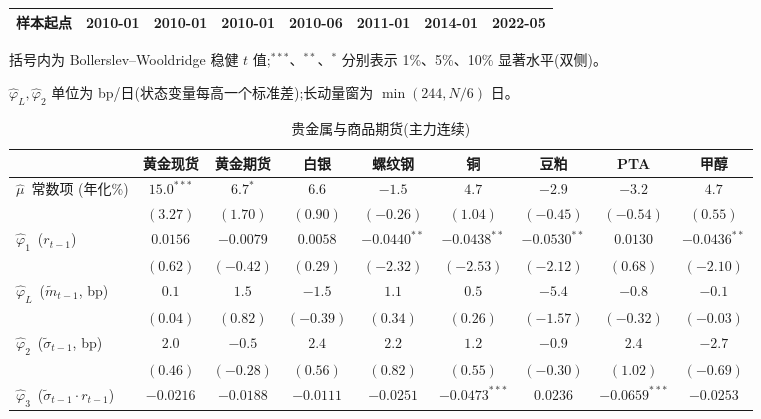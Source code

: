 \begin{table}[htbp]
\begin{threeparttable}
\begin{tabular}{lccccccc}
样本起点 & \scriptsize 2010-01 & \scriptsize 2010-01 & \scriptsize 2010-01 & \scriptsize 2010-06 & \scriptsize 2011-01 & \scriptsize 2014-01 & \scriptsize 2022-05 \\
\bottomrule
\end{tabular}
\begin{tablenotes}\scriptsize
\item 括号内为 Bollerslev--Wooldridge 稳健 $t$ 值;$^{***}$、$^{**}$、$^{*}$ 分别表示 1\%、5\%、10\% 显著水平(双侧)。
\item $\hat\varphi_L,\hat\varphi_2$ 单位为 bp/日(状态变量每高一个标准差);长动量窗为 $\min(244,N/6)$ 日。
\end{tablenotes}\end{threeparttable}\end{table}

\begin{table}[htbp]\centering
\caption{贵金属与商品期货(主力连续)}\label{tab:comm}
\footnotesize\setlength{\tabcolsep}{4pt}
\begin{threeparttable}
\begin{tabular}{lcccccccc}
\toprule
 & 黄金现货 & 黄金期货 & 白银 & 螺纹钢 & 铜 & 豆粕 & PTA & 甲醇 \\
\midrule
$\hat\mu$~常数项 (年化\%) & $15.0^{***}$ & $6.7^{*}$ & $6.6$ & $-1.5$ & $4.7$ & $-2.9$ & $-3.2$ & $4.7$ \\
 & $(3.27)$ & $(1.70)$ & $(0.90)$ & $(-0.26)$ & $(1.04)$ & $(-0.45)$ & $(-0.54)$ & $(0.55)$ \\[2pt]
$\hat\varphi_1$~($r_{t-1}$) & $0.0156$ & $-0.0079$ & $0.0058$ & $-0.0440^{**}$ & $-0.0438^{**}$ & $-0.0530^{**}$ & $0.0130$ & $-0.0436^{**}$ \\
 & $(0.62)$ & $(-0.42)$ & $(0.29)$ & $(-2.32)$ & $(-2.53)$ & $(-2.12)$ & $(0.68)$ & $(-2.10)$ \\[2pt]
$\hat\varphi_L$~($\tilde m_{t-1}$, bp) & $0.1$ & $1.5$ & $-1.5$ & $1.1$ & $0.5$ & $-5.4$ & $-0.8$ & $-0.1$ \\
 & $(0.04)$ & $(0.82)$ & $(-0.39)$ & $(0.34)$ & $(0.26)$ & $(-1.57)$ & $(-0.32)$ & $(-0.03)$ \\[2pt]
$\hat\varphi_2$~($\tilde\sigma_{t-1}$, bp) & $2.0$ & $-0.5$ & $2.4$ & $2.2$ & $1.2$ & $-0.9$ & $2.4$ & $-2.7$ \\
 & $(0.46)$ & $(-0.28)$ & $(0.56)$ & $(0.82)$ & $(0.55)$ & $(-0.30)$ & $(1.02)$ & $(-0.69)$ \\[2pt]
$\hat\varphi_3$~($\tilde\sigma_{t-1}\!\cdot\! r_{t-1}$) & $-0.0216$ & $-0.0188$ & $-0.0111$ & $-0.0251$ & $-0.0473^{***}$ & $0.0236$ & $-0.0659^{***}$ & $-0.0253$ \\

\end{tabular}
\end{threeparttable}
\end{table}
